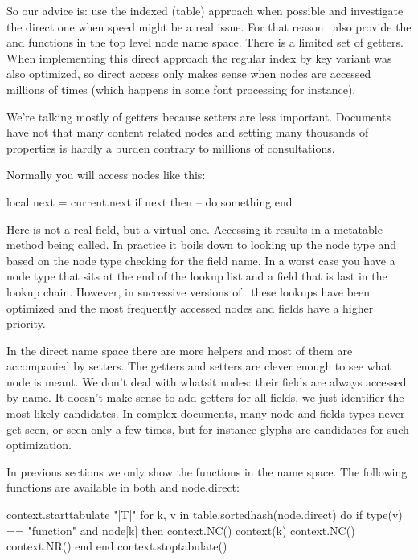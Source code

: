 So our advice is: use the indexed (table) approach when possible and investigate
the direct one when speed might be a real issue. For that reason \LUATEX\ also
provide the  and  functions in the top level node
name space. There is a limited set of getters. When implementing this direct
approach the regular index by key variant was also optimized, so direct access
only makes sense when nodes are accessed millions of times (which happens in some
font processing for instance).

We're talking mostly of getters because setters are less important. Documents
have not that many content related nodes and setting many thousands of properties
is hardly a burden contrary to millions of consultations.

Normally you will access nodes like this:

\starttyping
local next = current.next
if next then
    -- do something
end
\stoptyping

Here  is not a real field, but a virtual one. Accessing it results in
a metatable method being called. In practice it boils down to looking up the node
type and based on the node type checking for the field name. In a worst case you
have a node type that sits at the end of the lookup list and a field that is last
in the lookup chain. However, in successive versions of \LUATEX\ these lookups
have been optimized and the most frequently accessed nodes and fields have a
higher priority.

In the direct name space there are more helpers and most of them are accompanied
by setters. The getters and setters are clever enough to see what node is meant.
We don't deal with whatsit nodes: their fields are always accessed by name. It
doesn't make sense to add getters for all fields, we just identifier the most
likely candidates. In complex documents, many node and fields types never get
seen, or seen only a few times, but for instance glyphs are candidates for such
optimization.

In previous sections we only show the functions in the 
name space. The following functions are available in both  and \type
{node.direct}:

\startthreerows
\startluacode
    context.starttabulate { "|T|" }
    for k, v in table.sortedhash(node.direct) do
        if type(v) == "function" and node[k] then
            context.NC() context(k)
            context.NC() context.NR()
        end
    end
    context.stoptabulate()
\stopluacode
\stopthreerows

